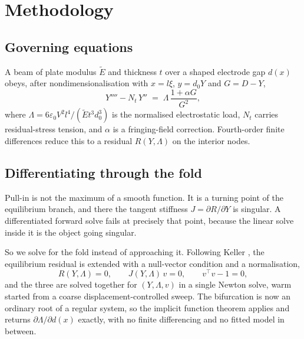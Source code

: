 \documentclass[conference,10pt]{IEEEtran}
\begin{document}

\section{Methodology}

\subsection{Governing equations}
A beam of plate modulus $\tilde{E}$ and thickness $t$ over a shaped electrode
gap $d(x)$ obeys, after nondimensionalisation with $x=l\xi$, $y=d_0Y$ and
$G=D-Y$,
\begin{equation}
Y'''' - N_t\,Y'' \;=\; \Lambda\,\frac{1+\alpha G}{G^{2}},
\label{eq:beam}
\end{equation}
where $\Lambda = 6\varepsilon_0V^2l^4/(\tilde{E}t^3d_0^3)$ is the normalised
electrostatic load, $N_t$ carries residual-stress tension, and $\alpha$ is a
fringing-field correction. Fourth-order finite differences reduce this to a
residual $R(Y,\Lambda)$ on the interior nodes.

\subsection{Differentiating through the fold}
Pull-in is not the maximum of a smooth function. It is a turning point of the
equilibrium branch, and there the tangent stiffness $J=\partial R/\partial Y$
is singular. A differentiated forward solve fails at precisely that point,
because the linear solve inside it is the object going singular.

So we solve for the fold instead of approaching it. Following Keller
\cite{keller}, the equilibrium residual is extended with a null-vector
condition and a normalisation,
\begin{equation}
R(Y,\Lambda)=0,\qquad J(Y,\Lambda)\,v=0,\qquad v^{\!\top}v-1=0,
\label{eq:fold}
\end{equation}
and the three are solved together for $(Y,\Lambda,v)$ in a single Newton solve,
warm started from a coarse displacement-controlled sweep. The bifurcation is
now an ordinary root of a regular system, so the implicit function theorem
applies and returns $\partial\Lambda/\partial d(x)$ exactly, with no finite
differencing and no fitted model in between.
\end{document}
